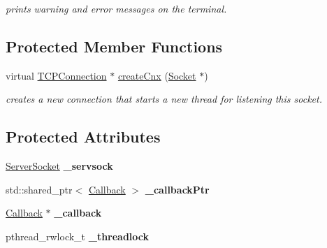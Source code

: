 \begin{DoxyCompactItemize}
\begin{DoxyCompactList}\small\item\em prints warning and error messages on the terminal. \end{DoxyCompactList}\end{DoxyCompactItemize}
\subsection*{Protected Member Functions}
\begin{DoxyCompactItemize}
\item 
\hypertarget{classcppu_1_1TCPServer_abe314b95a31c88b479c81ec9bf123c65}{virtual \hyperlink{classcppu_1_1TCPConnection}{T\+C\+P\+Connection} $\ast$ \hyperlink{classcppu_1_1TCPServer_abe314b95a31c88b479c81ec9bf123c65}{create\+Cnx} (\hyperlink{classcppu_1_1Socket}{Socket} $\ast$)}\label{classcppu_1_1TCPServer_abe314b95a31c88b479c81ec9bf123c65}

\begin{DoxyCompactList}\small\item\em creates a new connection that starts a new thread for listening this socket. \end{DoxyCompactList}\end{DoxyCompactItemize}
\subsection*{Protected Attributes}
\begin{DoxyCompactItemize}
\item 
\hypertarget{classcppu_1_1TCPServer_a8e4422abf23dc5bd195d05a3e9eee167}{\hyperlink{classcppu_1_1ServerSocket}{Server\+Socket} {\bfseries \+\_\+servsock}}\label{classcppu_1_1TCPServer_a8e4422abf23dc5bd195d05a3e9eee167}

\item 
\hypertarget{classcppu_1_1TCPServer_abe36d427d7b047cdd342e282611c841e}{std\+::shared\+\_\+ptr$<$ \hyperlink{structcppu_1_1TCPServer_1_1Callback}{Callback} $>$ {\bfseries \+\_\+callback\+Ptr}}\label{classcppu_1_1TCPServer_abe36d427d7b047cdd342e282611c841e}

\item 
\hypertarget{classcppu_1_1TCPServer_a68940bd70ac6941ca49d1e51b631f5e9}{\hyperlink{structcppu_1_1TCPServer_1_1Callback}{Callback} $\ast$ {\bfseries \+\_\+callback}}\label{classcppu_1_1TCPServer_a68940bd70ac6941ca49d1e51b631f5e9}

\item 
\hypertarget{classcppu_1_1TCPServer_aea2dbb4b5762044217096e52cd559b97}{pthread\+\_\+rwlock\+\_\+t {\bfseries \+\_\+threadlock}}\label{classcppu_1_1TCPServer_aea2dbb4b5762044217096e52cd559b97}

\end{DoxyCompactItemize}
